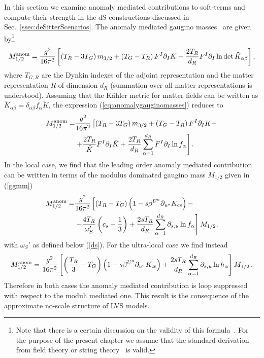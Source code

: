 \documentclass[12pt,a4paper]{book}
\def\nn{\nonumber}
\def\nn{\nonumber}
\begin{document}
In this section we examine anomaly mediated contributions to soft-terms and compute their strength in the dS constructions discussed in Sec.~\ref{ssec:deSitterScenarios}. The anomaly mediated gaugino masses~\cite{Bagger:1999rd} are given by\footnote{Note that there is a certain discussion on the validity of this formula~\cite{deAlwis:2008aq}. For the purpose of the present chapter we assume that the standard derivation from field theory or string theory~\cite{Conlon:2010qy} is valid.}
\begin{align}
M_{1/2}^{\rm anom}=\frac{g^2}{16 \pi^2}\left[\left(T_R-3T_G\right)m_{3/2}+\left(T_G-T_R\right)F^I\partial_I K
+\frac{2T_R}{d_R}F^I\partial_I\ln\det \tilde{K}_{\alpha\beta}\right],
\label{eq:anomalygauginomasses}
\end{align}
where $T_{G,R}$ are the Dynkin indexes of the adjoint representation and the matter representation $R$ of dimension $d_R$ (summation over all matter representations is understood). Assuming that the K\"ahler metric for matter fields can be written as $\tilde{K}_{\alpha\beta}=\delta_{\alpha\beta} f_\alpha\tilde{K}$,
the expression (\ref{eq:anomalygauginomasses}) reduces to
\begin{align}
M_{1/2}^{\rm anom}=&\frac{g^2}{16 \pi^2}\left[\left(T_R-3T_G\right)m_{3/2}+\left(T_G-T_R\right)F^I\partial_I K
+ \right. \nn \\
&\left.+\frac{2T_R}{\tilde{K}} F^I\partial_I\tilde{K}+\frac{2T_R}{d_R}\sum_{\alpha=1}^{d_R} F^I\partial_I\ln f_\alpha\right].
\label{eq:anomalygauginomasses2}
\end{align}
In the local case, we find that the leading order anomaly mediated contribution can be written in terms
of the modulus dominated gaugino mass $M_{1/2}$ given in (\ref{ggmm})
\begin{align}
M_{1/2}^{\rm anom} =& \frac{g^2}{16\pi^2} \left[\left(T_R - T_G\right)\left(1-s\beta^{U^a}\partial_{u^a} K_{\rm cs}\right) - \right. \nn \\
&\left. -\frac{4 T_R}{\omega_S'} \left(c_s-\frac 13 \right)+\frac{2sT_R}{d_R}\sum_{\alpha=1}^{d_R} \partial_{s,u}\ln f_\alpha\right] M_{1/2},
\label{anorel}
\end{align}
with $\omega_S'$ as defined below (\ref{ds}). For the ultra-local case we find instead
\begin{align}
M_{1/2}^{\rm anom} = \frac{g^2}{16\pi^2} \left[\left(\frac{T_R}{3} - T_G\right)\left(1-s \beta^{U^a}\partial_{u^a} K_{\rm cs}\right) +\frac{2sT_R}{d_R}\sum_{\alpha=1}^{d_R} \partial_{s,u}\ln h_\alpha\right] M_{1/2}\, .
\label{anorel2}
\end{align}
Therefore in both cases the anomaly mediated contribution is loop suppressed with respect to the moduli mediated one. This result is the consequence of the approximate no-scale structure of LVS models.\\
\end{document}
